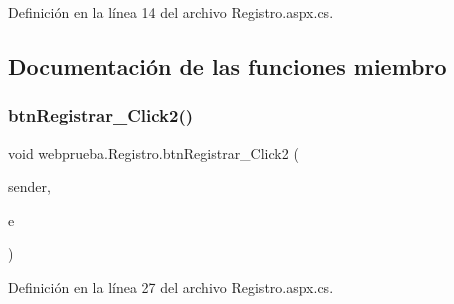 Definición en la línea 14 del archivo Registro.\+aspx.\+cs.



\subsection{Documentación de las funciones miembro}
\mbox{\label{classwebprueba_1_1_registro_a142c34865f9d885c718e351a53c9372b}} 
\subsubsection{\texorpdfstring{btnRegistrar\_Click2()}{btnRegistrar\_Click2()}\hspace{0.1cm}{\footnotesize\ttfamily [1/2]}}
{\footnotesize\ttfamily void webprueba.\+Registro.\+btn\+Registrar\+\_\+\+Click2 (\begin{DoxyParamCaption}\item[{object}]{sender,  }\item[{Event\+Args}]{e }\end{DoxyParamCaption})\hspace{0.3cm}{\ttfamily [protected]}}



Definición en la línea 27 del archivo Registro.\+aspx.\+cs.


